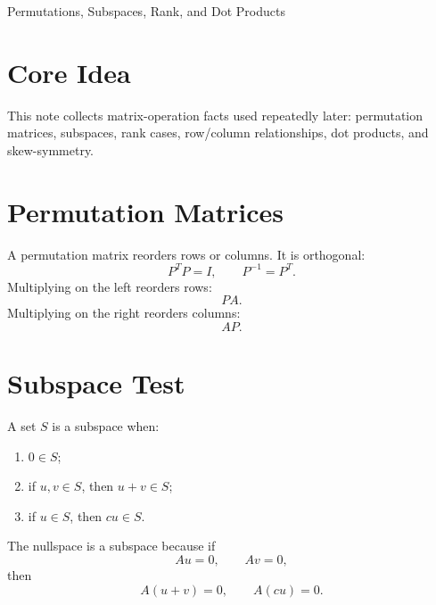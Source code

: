 \documentclass[10pt]{article}
\begin{document}
\begin{center}
{\LARGE Permutations, Subspaces, Rank, and Dot Products\par}
\end{center}

\section{Core Idea}


This note collects matrix-operation facts used repeatedly later: permutation matrices, subspaces, rank cases, row/column relationships, dot products, and skew-symmetry.

\section{Permutation Matrices}

A permutation matrix reorders rows or columns. It is orthogonal:
\[
P^{T}P=I,
\qquad
P^{-1}=P^{T}.
\]
Multiplying on the left reorders rows:
\[
PA.
\]
Multiplying on the right reorders columns:
\[
AP.
\]


\section{Subspace Test}

A set \(S\) is a subspace when:
\begin{enumerate}
  \item \(0\in S\);
  \item if \(u,v\in S\), then \(u+v\in S\);
  \item if \(u\in S\), then \(cu\in S\).
\end{enumerate}

The nullspace is a subspace because if
\[
Au=0,
\qquad
Av=0,
\]
then
\[
A(u+v)=0,
\qquad
A(cu)=0.
\]

\end{document}
